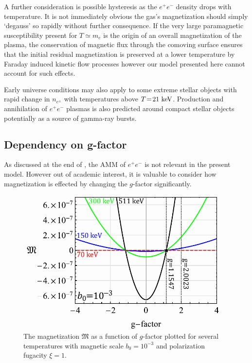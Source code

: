 A further consideration is possible hysteresis as the $e^{+}e^{-}$ density drops with temperature. It is not immediately obvious the gas's magnetization should simply `degauss' so rapidly without further consequence. If the very large paramagnetic susceptibility present for $T\simeq m_{e}$ is the origin of an overall magnetization of the plasma, the conservation of magnetic flux through the comoving surface ensures that the initial residual magnetization is preserved at a lower temperature by Faraday induced kinetic flow processes however our model presented here cannot account for such effects.

Early universe conditions may also apply to some extreme stellar objects with rapid change in $n_{e^{\pm}}$ with temperatures above $T\!=\!21\text{ keV}$. Production and annihilation of $e^{+}e^{-}$ plasmas is also predicted around compact stellar objects~\citep{Ruffini:2009hg,Ruffini:2012it} potentially as a source of gamma-ray bursts.

\subsection{Dependency on g-factor}
\label{sec:gfac}

\noindent As discussed at the end of , the AMM of $e^{+}e^{-}$ is not relevant in the present model. However out of academic interest, it is valuable to consider how magnetization is effected by changing the $g$-factor significantly.

\begin{figure}[ht]
 \centering
 \includegraphics[width=0.95\textwidth]{plots/chap04cosmo/thesis_gfac.pdf}
 \caption{The magnetization $\mathfrak M$ as a function of $g$-factor plotted for several temperatures with magnetic scale $b_{0}=10^{-3}$ and polarization fugacity $\xi=1$.}
 \label{fig:gfac} 
\end{figure}

